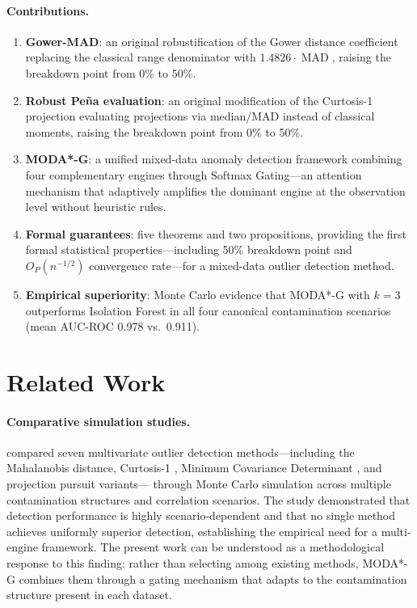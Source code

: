 \documentclass[11pt]{article}
\theoremstyle{plain}
\theoremstyle{definition}
\DeclareMathOperator{\MAD}{MAD}
\begin{document}
\paragraph{Contributions.}
\begin{enumerate}[label=(\roman*)]
  \item \textbf{Gower-MAD}: an original robustification
    of the Gower distance coefficient \citep{gower1971}
    replacing the classical range denominator with
    $1.4826 \cdot \MAD$, raising the breakdown point from
    0\% to 50\%.
  \item \textbf{Robust Pe\~{n}a evaluation}: an original
    modification of the Curtosis-1 projection
    \citep{pena2001} evaluating projections via median/MAD
    instead of classical moments, raising the breakdown
    point from 0\% to 50\%.
  \item \textbf{MODA*-G}: a unified mixed-data anomaly
    detection framework combining four complementary
    engines through Softmax Gating---an attention mechanism
    that adaptively amplifies the dominant engine at the
    observation level without heuristic rules.
  \item \textbf{Formal guarantees}: five theorems and two
    propositions, providing the first formal statistical
    properties---including 50\% breakdown point and
    $O_P(n^{-1/2})$ convergence rate---for a mixed-data
    outlier detection method.
  \item \textbf{Empirical superiority}: Monte Carlo evidence
    that MODA*-G with $k=3$ outperforms Isolation Forest
    in all four canonical contamination scenarios (mean
    AUC-ROC 0.978 vs.\ 0.911).
\end{enumerate}

\section{Related Work}
\label{sec:related}

\paragraph{Comparative simulation studies.}
\citet{marcano2013} compared seven multivariate outlier
detection methods---including the Mahalanobis distance,
Curtosis-1 \citep{pena2001}, Minimum Covariance Determinant
\citep{rousseeuw1985}, and projection pursuit variants---
through Monte Carlo simulation across multiple contamination
structures and correlation scenarios. The study demonstrated
that detection performance is highly scenario-dependent and
that no single method achieves uniformly superior detection,
establishing the empirical need for a multi-engine framework.
The present work can be understood as a methodological
response to this finding: rather than selecting among
existing methods, MODA*-G combines them through a gating
mechanism that adapts to the contamination structure present
in each dataset.
\end{document}
